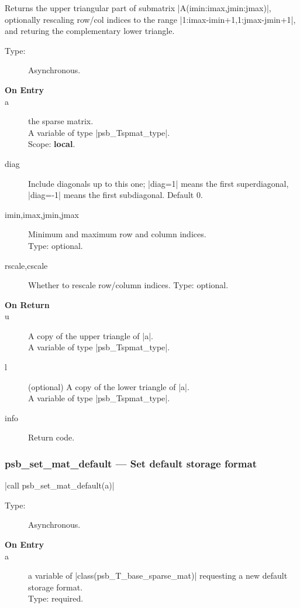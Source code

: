Returns the upper triangular part of submatrix
\fortinline|A(imin:imax,jmin:jmax)|, optionally rescaling row/col indices to
the range \fortinline|1:imax-imin+1,1:jmax-jmin+1|, and returing the
complementary lower triangle. 
\begin{description}
\item[Type:] Asynchronous.
\item[\bf On Entry]
\item[a] the sparse matrix.\\
A variable of type \fortinline|psb_Tspmat_type|.\\
Scope: {\bf local}.\\
\item[diag] Include diagonals up to this one; \fortinline|diag=1| means the
  first superdiagonal, \fortinline|diag=-1| means the first subdiagonal. 
Default 0.
\item[imin,imax,jmin,jmax] Minimum and maximum row and column indices.\\
Type: optional.
\item[rscale,cscale] Whether to rescale row/column indices.
Type: optional.
\end{description}
\begin{description}
\item[\bf On Return]
\item[u]  A copy  of the upper triangle of \fortinline|a|.\\
A variable of type \fortinline|psb_Tspmat_type|.
\item[l] (optional) A copy  of the lower triangle of \fortinline|a|.\\
A variable of type \fortinline|psb_Tspmat_type|.
\item[info] Return code. 
\end{description}




\subsubsection{psb\_set\_mat\_default --- Set default  storage format}


\fortinline|call  psb_set_mat_default(a)|

\begin{description}
\item[Type:] Asynchronous.
\item[\bf On Entry]
\item[a] a variable of \fortinline|class(psb_T_base_sparse_mat)|  requesting
  a new default storage format.\\ 
Type: required.
\end{description}





